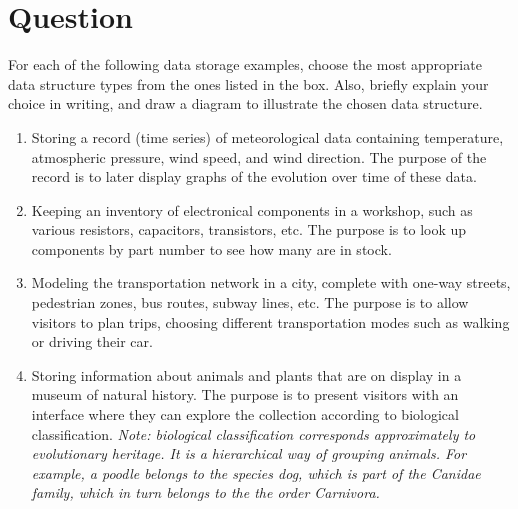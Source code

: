 \documentclass[a4paper]{article}
\newcounter{question}
\newcommand{\question}{\refstepcounter{question}\section*{Question~\thequestion}}
\renewcommand*\thequestion{\arabic{question}}
\begin{document}
\pagebreak
\pagestyle{plain}
\thispagestyle{plain}
\setcounter{page}{1}



\question

For each of the following data storage examples, choose the most appropriate data structure types from the ones listed in the box.
Also, briefly explain your choice in writing, and draw a diagram to illustrate the chosen data structure.

\begin{center}
\end{center}


\begin{enumerate}
\item
  Storing a record (time series) of meteorological data containing temperature, atmospheric pressure, wind speed, and wind direction.
  The purpose of the record is to later display graphs of the evolution over time of these data.
\item
  Keeping an inventory of electronical components in a workshop, such as various resistors, capacitors, transistors, etc.
  The purpose is to look up components by part number to see how many are in stock.
\item
  Modeling the transportation network in a city, complete with one-way streets, pedestrian zones, bus routes, subway lines, etc.
  The purpose is to allow visitors to plan trips, choosing different transportation modes such as walking or driving their car.
\item
  Storing information about animals and plants that are on display in a museum of natural history.
  The purpose is to present visitors with an interface where they can explore the collection according to biological classification.
  \emph{Note: biological classification corresponds approximately to evolutionary heritage.
    It is a hierarchical way of grouping animals.
    For example, a poodle belongs to the \emph{species} dog, which is part of the Canidae \emph{family}, which in turn belongs to the the \emph{order} Carnivora.}
\end{enumerate}
\end{document}
